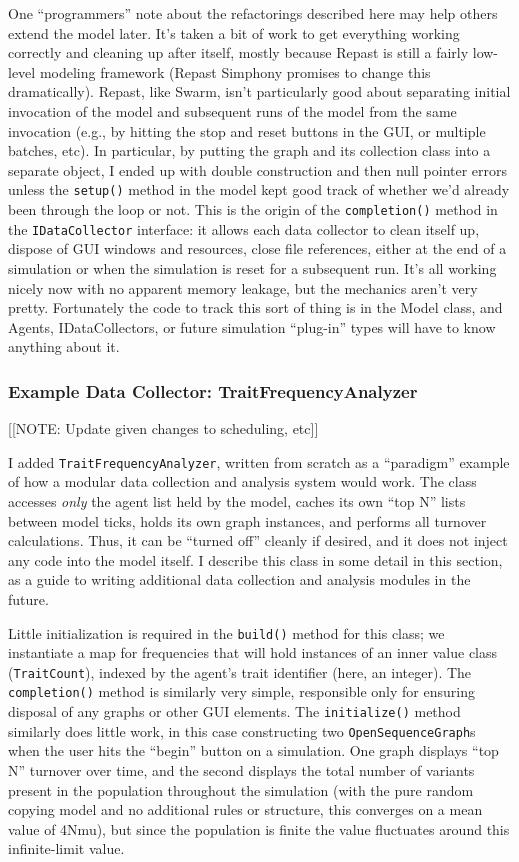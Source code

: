 \documentclass[noid]{kluwer-mem-proposal}
\begin{document}
\begin{article}
One ``programmers'' note about the refactorings described here may help others
extend the model later. It's taken a bit of work to
get everything working correctly and cleaning up after itself, mostly because
Repast is still a fairly low-level modeling framework (Repast Simphony promises
to change this dramatically). Repast, like
Swarm, isn't particularly good about separating initial invocation of the model
and subsequent runs of the model from the same invocation (e.g., by hitting the
stop and reset buttons in the GUI, or multiple batches, etc).  In particular, by
putting the graph and its collection class into a separate object, I ended up
with double construction and then null pointer errors unless the
\texttt{setup()} method in the model kept good track of whether we'd already
been through the loop or not.  This is the origin of the \texttt{completion()}
method in the \texttt{IDataCollector} interface:  it allows each data collector
to clean itself up, dispose of GUI windows and resources, close file references,
either at the end of a simulation or when the simulation is reset for a
subsequent run.  It's all working nicely now with no apparent memory leakage,
but the mechanics aren't very pretty.  Fortunately the code to track this sort of
thing is in the Model class, and Agents, IDataCollectors, or future simulation
``plug-in'' types will have to know anything about it.


\subsubsection{Example Data Collector:  TraitFrequencyAnalyzer}
[[NOTE: Update given changes to scheduling, etc]]

I added \texttt{TraitFrequencyAnalyzer}, written from scratch as a
``paradigm'' example of how a modular data collection and analysis system would
work.  The class accesses \emph{only} the agent list held by the model, caches
its own ``top N'' lists between model ticks, holds its own graph instances, and
performs all turnover calculations.  Thus, it can be ``turned off'' cleanly if
desired, and it does not inject any code into the model itself.  I describe this
class in some detail in this section, as a guide to writing additional data
collection and analysis modules in the future.  

Little initialization is required in the \texttt{build()} method for this class;
we instantiate a map for frequencies that will hold instances of an inner value
class (\texttt{TraitCount}), indexed by the agent's trait identifier (here, an
integer).  The \texttt{completion()} method is similarly very simple,
responsible only for ensuring disposal of any graphs or other GUI elements.  The
\texttt{initialize()} method similarly does little work, in this case
constructing two \texttt{OpenSequenceGraph}s when the user hits the ``begin''
button on a simulation.  One graph displays ``top N'' turnover over time, and
the second displays the total number of variants present in the population
throughout the simulation (with the pure random copying model and no additional
rules or structure, this converges on a mean value of 4Nmu), but since the
population is finite the value fluctuates around this infinite-limit value.


\end{article}
\end{document}

